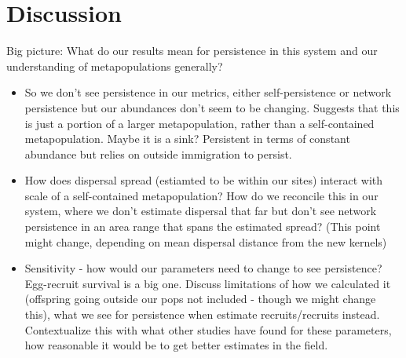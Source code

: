 \documentclass[12pt, oneside]{article}   	%
\begin{document}
\section*{Discussion}
Big picture: What do our results mean for persistence in this system and our understanding of metapopulations generally?
\begin{itemize}
	\item So we don't see persistence in our metrics, either self-persistence or network persistence but our abundances don't seem to be changing. Suggests that this is just a portion of a larger metapopulation, rather than a self-contained metapopulation. Maybe it is a sink? Persistent in terms of constant abundance but relies on outside immigration to persist.
	\item How does dispersal spread (estiamted to be within our sites) interact with scale of a self-contained metapopulation? How do we reconcile this in our system, where we don't estimate dispersal that far but don't see network persistence in an area range that spans the estimated spread? (This point might change, depending on mean dispersal distance from the new kernels)
	\item Sensitivity - how would our parameters need to change to see persistence? Egg-recruit survival is a big one. Discuss limitations of how we calculated it (offspring going outside our pops not included - though we might change this), what we see for persistence when estimate recruits/recruits instead. Contextualize this with what other studies have found for these parameters, how reasonable it would be to get better estimates in the field.
\end{itemize}
\end{document}
